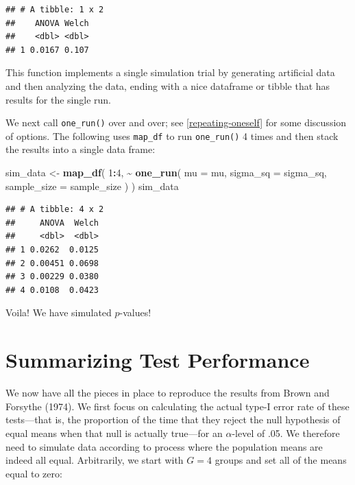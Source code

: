 \documentclass[
]{book}
\newenvironment{Shaded}{\begin{snugshade}}{\end{snugshade}}
\newcommand{\AttributeTok}[1]{\textcolor[rgb]{0.13,0.29,0.53}{#1}}
\newcommand{\DecValTok}[1]{\textcolor[rgb]{0.00,0.00,0.81}{#1}}
\newcommand{\FunctionTok}[1]{\textcolor[rgb]{0.13,0.29,0.53}{\textbf{#1}}}
\newcommand{\NormalTok}[1]{#1}
\newcommand{\OtherTok}[1]{\textcolor[rgb]{0.56,0.35,0.01}{#1}}
\newcommand{\SpecialCharTok}[1]{\textcolor[rgb]{0.81,0.36,0.00}{\textbf{#1}}}
\begin{document}
\begin{verbatim}
## # A tibble: 1 x 2
##    ANOVA Welch
##    <dbl> <dbl>
## 1 0.0167 0.107
\end{verbatim}

This function implements a single simulation trial by generating artificial data and then analyzing the data, ending with a nice dataframe or tibble that has results for the single run.

We next call \texttt{one\_run()} over and over; see \ref{repeating-oneself} for some discussion of options.
The following uses \texttt{map\_df} to run \texttt{one\_run()} 4 times and then stack the results into a single data frame:

\begin{Shaded}
\begin{Highlighting}[]
\NormalTok{sim\_data }\OtherTok{\textless{}{-}} \FunctionTok{map\_df}\NormalTok{(}
  \DecValTok{1}\SpecialCharTok{:}\DecValTok{4}\NormalTok{, }
  \SpecialCharTok{\textasciitilde{}} \FunctionTok{one\_run}\NormalTok{(}
      \AttributeTok{mu =}\NormalTok{ mu, }
      \AttributeTok{sigma\_sq =}\NormalTok{ sigma\_sq, }
      \AttributeTok{sample\_size =}\NormalTok{ sample\_size}
\NormalTok{    )}
\NormalTok{)}
\NormalTok{sim\_data}
\end{Highlighting}
\end{Shaded}

\begin{verbatim}
## # A tibble: 4 x 2
##     ANOVA  Welch
##     <dbl>  <dbl>
## 1 0.0262  0.0125
## 2 0.00451 0.0698
## 3 0.00229 0.0380
## 4 0.0108  0.0423
\end{verbatim}

Voila! We have simulated \(p\)-values!

\section{Summarizing Test Performance}\label{summarizing-test-performance}

We now have all the pieces in place to reproduce the results from Brown and Forsythe (1974).
We first focus on calculating the actual type-I error rate of these tests---that is, the proportion of the time that they reject the null hypothesis of equal means when that null is actually true---for an \(\alpha\)-level of .05.
We therefore need to simulate data according to process where the population means are indeed all equal. Arbitrarily, we start with \(G = 4\) groups and set all of the means equal to zero:
\end{document}
